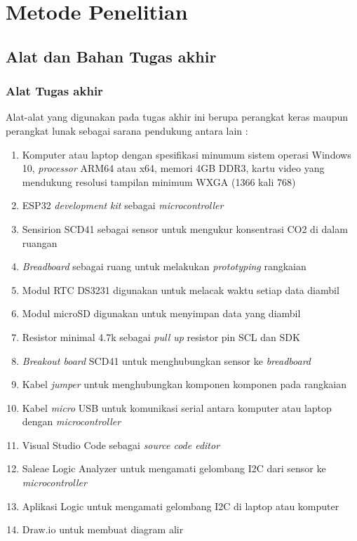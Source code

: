 \chapter{Metode Penelitian}

\section{Alat dan Bahan Tugas akhir}

    \subsection{Alat Tugas akhir}
    
    Alat-alat yang digunakan pada tugas akhir ini berupa perangkat keras maupun perangkat lunak sebagai sarana pendukung antara lain :

    \begin{enumerate}
        \item Komputer atau laptop dengan spesifikasi minumum sistem operasi Windows 10, \textit{processor} ARM64 atau x64, memori 4GB DDR3, kartu video yang mendukung resolusi tampilan minimum WXGA (1366 kali 768)
	\item ESP32 \textit{development kit} sebagai \textit{microcontroller}
        \item Sensirion SCD41 sebagai sensor untuk mengukur konsentrasi CO2 di dalam ruangan
        \item \textit{Breadboard} sebagai ruang untuk melakukan \textit{prototyping} rangkaian
        \item Modul RTC DS3231 digunakan untuk melacak waktu setiap data diambil
        \item Modul microSD digunakan untuk menyimpan data yang diambil
        \item Resistor minimal 4.7k sebagai \textit{pull up} resistor pin SCL dan SDK
        \item \textit{Breakout board} SCD41 untuk menghubungkan sensor ke \textit{breadboard}
        \item Kabel \textit{jumper }untuk menghubungkan komponen komponen pada rangkaian
        \item Kabel \textit{micro} USB untuk komunikasi serial antara komputer atau laptop dengan \textit{microcontroller}
        \item Visual Studio Code sebagai \textit{source code editor}
        \item Saleae Logic Analyzer untuk mengamati gelombang I2C dari sensor ke \textit{microcontroller}
        \item Aplikasi Logic untuk mengamati gelombang I2C di laptop atau komputer
        \item Draw.io untuk membuat diagram alir
    \end{enumerate}

